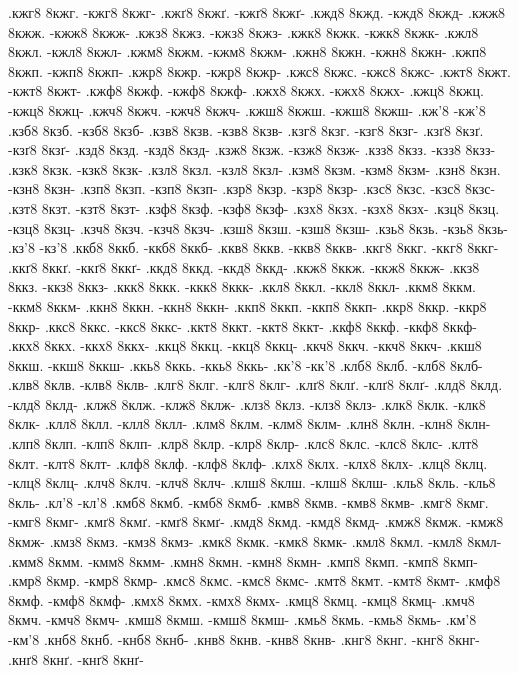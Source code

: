 {.кжг8 8кжг. -кжг8 8кжг-
.кжґ8 8кжґ. -кжґ8 8кжґ-
.кжд8 8кжд. -кжд8 8кжд-
.кжж8 8кжж. -кжж8 8кжж-
.кжз8 8кжз. -кжз8 8кжз-
.кжк8 8кжк. -кжк8 8кжк-
.кжл8 8кжл. -кжл8 8кжл-
.кжм8 8кжм. -кжм8 8кжм-
.кжн8 8кжн. -кжн8 8кжн-
.кжп8 8кжп. -кжп8 8кжп-
.кжр8 8кжр. -кжр8 8кжр-
.кжс8 8кжс. -кжс8 8кжс-
.кжт8 8кжт. -кжт8 8кжт-
.кжф8 8кжф. -кжф8 8кжф-
.кжх8 8кжх. -кжх8 8кжх-
.кжц8 8кжц. -кжц8 8кжц-
.кжч8 8кжч. -кжч8 8кжч-
.кжш8 8кжш. -кжш8 8кжш-
.кж'8 -кж'8
.кзб8 8кзб. -кзб8 8кзб-
.кзв8 8кзв. -кзв8 8кзв-
.кзг8 8кзг. -кзг8 8кзг-
.кзґ8 8кзґ. -кзґ8 8кзґ-
.кзд8 8кзд. -кзд8 8кзд-
.кзж8 8кзж. -кзж8 8кзж-
.кзз8 8кзз. -кзз8 8кзз-
.кзк8 8кзк. -кзк8 8кзк-
.кзл8 8кзл. -кзл8 8кзл-
.кзм8 8кзм. -кзм8 8кзм-
.кзн8 8кзн. -кзн8 8кзн-
.кзп8 8кзп. -кзп8 8кзп-
.кзр8 8кзр. -кзр8 8кзр-
.кзс8 8кзс. -кзс8 8кзс-
.кзт8 8кзт. -кзт8 8кзт-
.кзф8 8кзф. -кзф8 8кзф-
.кзх8 8кзх. -кзх8 8кзх-
.кзц8 8кзц. -кзц8 8кзц-
.кзч8 8кзч. -кзч8 8кзч-
.кзш8 8кзш. -кзш8 8кзш-
.кзь8 8кзь. -кзь8 8кзь-
.кз'8 -кз'8
.ккб8 8ккб. -ккб8 8ккб-
.ккв8 8ккв. -ккв8 8ккв-
.ккг8 8ккг. -ккг8 8ккг-
.ккґ8 8ккґ. -ккґ8 8ккґ-
.ккд8 8ккд. -ккд8 8ккд-
.ккж8 8ккж. -ккж8 8ккж-
.ккз8 8ккз. -ккз8 8ккз-
.ккк8 8ккк. -ккк8 8ккк-
.ккл8 8ккл. -ккл8 8ккл-
.ккм8 8ккм. -ккм8 8ккм-
.ккн8 8ккн. -ккн8 8ккн-
.ккп8 8ккп. -ккп8 8ккп-
.ккр8 8ккр. -ккр8 8ккр-
.ккс8 8ккс. -ккс8 8ккс-
.ккт8 8ккт. -ккт8 8ккт-
.ккф8 8ккф. -ккф8 8ккф-
.ккх8 8ккх. -ккх8 8ккх-
.ккц8 8ккц. -ккц8 8ккц-
.ккч8 8ккч. -ккч8 8ккч-
.ккш8 8ккш. -ккш8 8ккш-
.ккь8 8ккь. -ккь8 8ккь-
.кк'8 -кк'8
.клб8 8клб. -клб8 8клб-
.клв8 8клв. -клв8 8клв-
.клг8 8клг. -клг8 8клг-
.клґ8 8клґ. -клґ8 8клґ-
.клд8 8клд. -клд8 8клд-
.клж8 8клж. -клж8 8клж-
.клз8 8клз. -клз8 8клз-
.клк8 8клк. -клк8 8клк-
.клл8 8клл. -клл8 8клл-
.клм8 8клм. -клм8 8клм-
.клн8 8клн. -клн8 8клн-
.клп8 8клп. -клп8 8клп-
.клр8 8клр. -клр8 8клр-
.клс8 8клс. -клс8 8клс-
.клт8 8клт. -клт8 8клт-
.клф8 8клф. -клф8 8клф-
.клх8 8клх. -клх8 8клх-
.клц8 8клц. -клц8 8клц-
.клч8 8клч. -клч8 8клч-
.клш8 8клш. -клш8 8клш-
.кль8 8кль. -кль8 8кль-
.кл'8 -кл'8
.кмб8 8кмб. -кмб8 8кмб-
.кмв8 8кмв. -кмв8 8кмв-
.кмг8 8кмг. -кмг8 8кмг-
.кмґ8 8кмґ. -кмґ8 8кмґ-
.кмд8 8кмд. -кмд8 8кмд-
.кмж8 8кмж. -кмж8 8кмж-
.кмз8 8кмз. -кмз8 8кмз-
.кмк8 8кмк. -кмк8 8кмк-
.кмл8 8кмл. -кмл8 8кмл-
.кмм8 8кмм. -кмм8 8кмм-
.кмн8 8кмн. -кмн8 8кмн-
.кмп8 8кмп. -кмп8 8кмп-
.кмр8 8кмр. -кмр8 8кмр-
.кмс8 8кмс. -кмс8 8кмс-
.кмт8 8кмт. -кмт8 8кмт-
.кмф8 8кмф. -кмф8 8кмф-
.кмх8 8кмх. -кмх8 8кмх-
.кмц8 8кмц. -кмц8 8кмц-
.кмч8 8кмч. -кмч8 8кмч-
.кмш8 8кмш. -кмш8 8кмш-
.кмь8 8кмь. -кмь8 8кмь-
.км'8 -км'8
.кнб8 8кнб. -кнб8 8кнб-
.кнв8 8кнв. -кнв8 8кнв-
.кнг8 8кнг. -кнг8 8кнг-
.кнґ8 8кнґ. -кнґ8 8кнґ-
}
